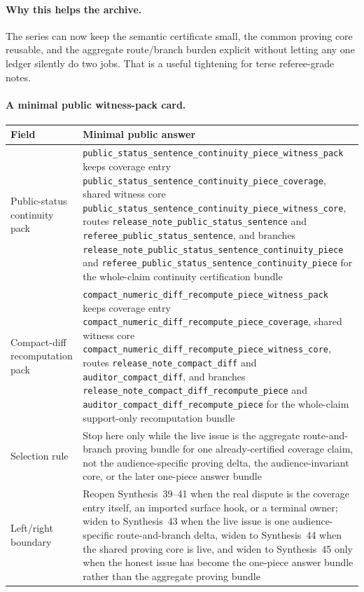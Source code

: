 \documentclass[11pt]{article}
\begin{document}
\paragraph{Why this helps the archive.}
The series can now keep the semantic certificate small, the common proving core reusable, and the aggregate route/branch burden explicit without letting any one ledger silently do two jobs.
That is a useful tightening for terse referee-grade notes.


\paragraph{A minimal public witness-pack card.}
\begin{table}[t]
\centering
\small
\begin{tabularx}{\linewidth}{@{}lX@{}}
\toprule
Field & Minimal public answer \\
\midrule
Public-status continuity pack & \nolinkurl{public_status_sentence_continuity_piece_witness_pack} keeps coverage entry \nolinkurl{public_status_sentence_continuity_piece_coverage}, shared witness core \nolinkurl{public_status_sentence_continuity_piece_witness_core}, routes \nolinkurl{release_note_public_status_sentence} and \nolinkurl{referee_public_status_sentence}, and branches \nolinkurl{release_note_public_status_sentence_continuity_piece} and \nolinkurl{referee_public_status_sentence_continuity_piece} for the whole-claim continuity certification bundle \\
Compact-diff recomputation pack & \nolinkurl{compact_numeric_diff_recompute_piece_witness_pack} keeps coverage entry \nolinkurl{compact_numeric_diff_recompute_piece_coverage}, shared witness core \nolinkurl{compact_numeric_diff_recompute_piece_witness_core}, routes \nolinkurl{release_note_compact_diff} and \nolinkurl{auditor_compact_diff}, and branches \nolinkurl{release_note_compact_diff_recompute_piece} and \nolinkurl{auditor_compact_diff_recompute_piece} for the whole-claim support-only recomputation bundle \\
Selection rule & Stop here only while the live issue is the aggregate route-and-branch proving bundle for one already-certified coverage claim, not the audience-specific proving delta, the audience-invariant core, or the later one-piece answer bundle \\
Left/right boundary & Reopen Synthesis~39--41 when the real dispute is the coverage entry itself, an imported surface hook, or a terminal owner; widen to Synthesis~43 when the live issue is one audience-specific route-and-branch delta, widen to Synthesis~44 when the shared proving core is live, and widen to Synthesis~45 only when the honest issue has become the one-piece answer bundle rather than the aggregate proving bundle \\

\end{tabularx}
\end{table}
\end{document}
